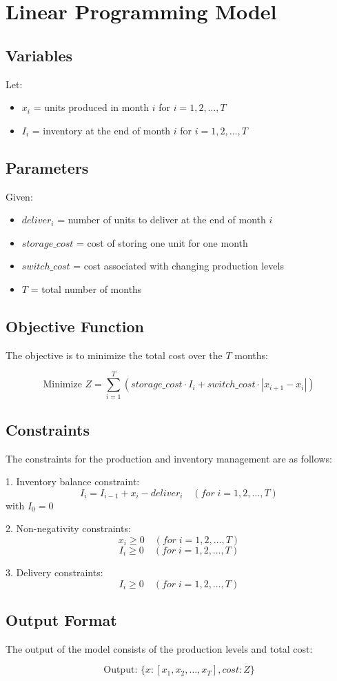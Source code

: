 \documentclass{article}
\begin{document}
\section*{Linear Programming Model}

\subsection*{Variables}
Let:
\begin{itemize}
    \item \( x_i \) = units produced in month \( i \) for \( i = 1, 2, \ldots, T \)
    \item \( I_i \) = inventory at the end of month \( i \) for \( i = 1, 2, \ldots, T \)
\end{itemize}

\subsection*{Parameters}
Given:
\begin{itemize}
    \item \( deliver_i \) = number of units to deliver at the end of month \( i \)
    \item \( storage\_cost \) = cost of storing one unit for one month
    \item \( switch\_cost \) = cost associated with changing production levels
    \item \( T \) = total number of months
\end{itemize}

\subsection*{Objective Function}
The objective is to minimize the total cost over the \( T \) months:

\[
\text{Minimize } Z = \sum_{i=1}^{T} \left( storage\_cost \cdot I_i + switch\_cost \cdot |x_{i+1} - x_i| \right)
\]

\subsection*{Constraints}
The constraints for the production and inventory management are as follows:

1. Inventory balance constraint:
   \[
   I_i = I_{i-1} + x_i - deliver_i \quad (for \; i = 1, 2, \ldots, T)
   \]
   with \( I_0 = 0 \)

2. Non-negativity constraints:
   \[
   x_i \geq 0 \quad (for \; i = 1, 2, \ldots, T)
   \]
   \[
   I_i \geq 0 \quad (for \; i = 1, 2, \ldots, T)
   \]

3. Delivery constraints:
   \[
   I_i \geq 0 \quad (for \; i = 1, 2, \ldots, T)
   \]

\subsection*{Output Format}
The output of the model consists of the production levels and total cost:

\[
\text{Output: } \{ x: [x_1, x_2, \ldots, x_T], cost: Z \}
\]
\end{document}
